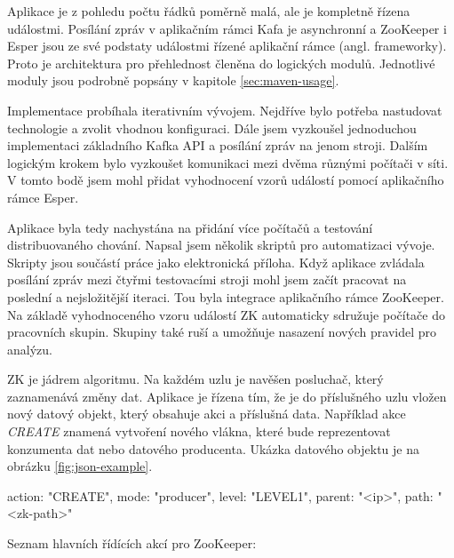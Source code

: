 \documentclass[
  digital, %
  table,   %
  nolof,     %
  nolot,     %
  oneside, %
  nocover,
  monochrome,
  12pt
]{fithesis3}
\begin{document}
Aplikace je z pohledu počtu řádků poměrně malá, ale je kompletně řízena událostmi. Posílání zpráv v aplikačním rámci Kafa je asynchronní a ZooKeeper i Esper jsou ze své podstaty událostmi řízené aplikační rámce (angl. frameworky). Proto je architektura pro přehlednost členěna do logických modulů. Jednotlivé moduly jsou podrobně popsány v kapitole \ref{sec:maven-usage}.

Implementace probíhala iterativním vývojem. Nejdříve bylo potřeba nastudovat technologie a zvolit vhodnou konfiguraci. Dále jsem vyzkoušel jednoduchou implementaci základního Kafka API a posílání zpráv na jenom stroji. Dalším logickým krokem bylo vyzkoušet komunikaci mezi dvěma různými počítači v síti. V tomto bodě jsem mohl přidat vyhodnocení vzorů událostí pomocí aplikačního rámce Esper.

Aplikace byla tedy nachystána na přidání více počítačů a testování distribuovaného chování. Napsal jsem několik skriptů pro automatizaci vývoje. Skripty jsou součástí práce jako elektronická příloha. Když aplikace zvládala posílání zpráv mezi čtyřmi testovacími stroji mohl jsem začít pracovat na poslední a nejsložitější iteraci. Tou byla integrace aplikačního rámce ZooKeeper. Na základě vyhodnoceného vzoru událostí ZK automaticky sdružuje počítače do pracovních skupin. Skupiny také ruší a umožňuje nasazení nových pravidel pro analýzu.

ZK je jádrem algoritmu. Na každém uzlu je navěšen posluchač, který zaznamenává změny dat. Aplikace je řízena tím, že je do příslušného uzlu vložen nový datový objekt, který obsahuje akci a příslušná data. Například akce \textit{CREATE} znamená vytvoření nového vlákna, které bude reprezentovat konzumenta dat nebo datového producenta. Ukázka datového objektu je na obrázku \ref{fig:json-example}.

\begin{center}
\begin{minipage}[H]{.8\linewidth}
\centering
	\begin{mylisting}
{
	action: "CREATE",
	mode: "producer",
	level: "LEVEL1",
	parent: "<ip>",
	path: "<zk-path>"
}
	\end{mylisting}
	\label{fig:json-example} 
\end{minipage}
\end{center}

Seznam hlavních řídících akcí pro ZooKeeper:
\end{document}
